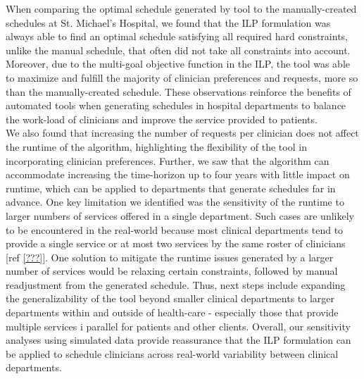 When comparing the optimal schedule generated by tool to the manually-created schedules at St. Michael's Hospital, we found that the ILP formulation was always able to find an optimal schedule satisfying all required hard constraints, unlike the manual schedule, that often did not take all constraints into account. Moreover, due to the multi-goal objective function in the ILP, the tool was able to maximize and fulfill the majority of clinician preferences and requests, more so than the manually-created schedule. These observations reinforce the benefits of automated tools when generating schedules in hospital departments to balance the work-load of clinicians and improve the service provided to patients. \\  %

We also found that increasing the number of requests per clinician does not affect the runtime of the algorithm, highlighting the flexibility of the tool in incorporating clinician preferences. Further, we saw that the algorithm can accommodate increasing the time-horizon up to four years with little impact on runtime, which can be applied to departments that generate schedules far in advance. One key limitation we identified was the sensitivity of the runtime to larger numbers of services offered in a single department. Such cases are unlikely to be encountered in the real-world because most clinical departments tend to provide a single service or at most two services by the same roster of clinicians [ref \ref{???}]. One solution to mitigate the runtime issues generated by a larger number of services would be relaxing certain constraints, followed by manual readjustment from the generated schedule. %
Thus, next steps include expanding the generalizability of the tool beyond smaller clinical departments to larger departments within and outside of health-care - especially those that provide multiple services i parallel for patients and other clients. Overall, our sensitivity analyses using simulated data provide reassurance that the ILP formulation can be applied to schedule clinicians across real-world variability between clinical departments. \\ %